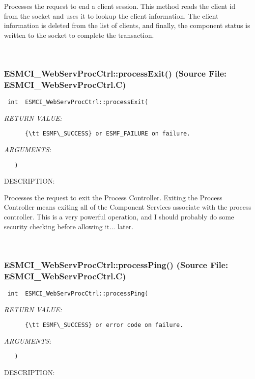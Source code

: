       Processes the request to end a client session.  This method reads the
      client id from the socket and uses it to lookup the client information.
      The client information is deleted from the list of clients, and finally,
      the component status is written to the socket to complete the
      transaction.
   
 
\mbox{}\hrulefill\
 
\subsubsection{ESMCI\_WebServProcCtrl::processExit() (Source File: ESMCI\_WebServProcCtrl.C)}


  
\begin{verbatim} int  ESMCI_WebServProcCtrl::processExit(\end{verbatim}{\em RETURN VALUE:}
\begin{verbatim}      {\tt ESMF\_SUCCESS} or ESMF_FAILURE on failure.\end{verbatim}{\em ARGUMENTS:}
\begin{verbatim}   )\end{verbatim}
{\sf DESCRIPTION:\\ }


      Processes the request to exit the Process Controller.  Exiting the
      Process Controller means exiting all of the Component Services associate
      with the process controller.  This is a very powerful operation, and
      I should probably do some security checking before allowing it... later.
   
 
\mbox{}\hrulefill\
 
\subsubsection{ESMCI\_WebServProcCtrl::processPing() (Source File: ESMCI\_WebServProcCtrl.C)}


  
\begin{verbatim} int  ESMCI_WebServProcCtrl::processPing(\end{verbatim}{\em RETURN VALUE:}
\begin{verbatim}      {\tt ESMF\_SUCCESS} or error code on failure.\end{verbatim}{\em ARGUMENTS:}
\begin{verbatim}   )\end{verbatim}
{\sf DESCRIPTION:\\ }



